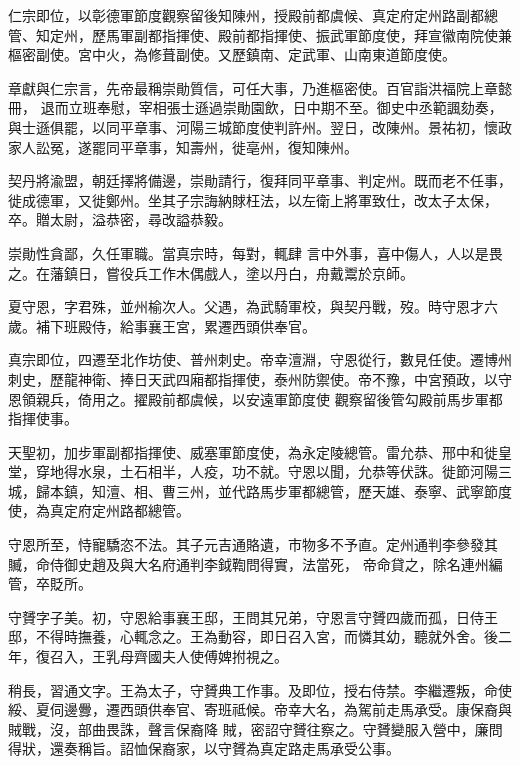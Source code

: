 \begin{pinyinscope}
 仁宗即位，以彰德軍節度觀察留後知陳州，授殿前都虞候、真定府定州路副都總管、知定州，歷馬軍副都指揮使、殿前都指揮使、振武軍節度使，拜宣徽南院使兼樞密副使。宮中火，為修葺副使。又歷鎮南、定武軍、山南東道節度使。



 章獻與仁宗言，先帝最稱崇勛質信，可任大事，乃進樞密使。百官詣洪福院上章懿冊，
 退而立班奉慰，宰相張士遜過崇勛園飲，日中期不至。御史中丞範諷劾奏，與士遜俱罷，以同平章事、河陽三城節度使判許州。翌日，改陳州。景祐初，懷政家人訟冤，遂罷同平章事，知壽州，徙亳州，復知陳州。



 契丹將渝盟，朝廷擇將備邊，崇勛請行，復拜同平章事、判定州。既而老不任事，徙成德軍，又徙鄭州。坐其子宗誨納賕枉法，以左衛上將軍致仕，改太子太保，卒。贈太尉，溢恭密，尋改謚恭毅。



 崇勛性貪鄙，久任軍職。當真宗時，每對，輒肆
 言中外事，喜中傷人，人以是畏之。在藩鎮日，嘗役兵工作木偶戲人，塗以丹白，舟戴鬻於京師。



 夏守恩，字君殊，並州榆次人。父遇，為武騎軍校，與契丹戰，歿。時守恩才六歲。補下班殿侍，給事襄王宮，累遷西頭供奉官。



 真宗即位，四遷至北作坊使、普州刺史。帝幸澶淵，守恩從行，數見任使。遷博州刺史，歷龍神衛、捧日天武四廂都指揮使，泰州防禦使。帝不豫，中宮預政，以守恩領親兵，倚用之。擢殿前都虞候，以安遠軍節度使
 觀察留後管勾殿前馬步軍都指揮使事。



 天聖初，加步軍副都指揮使、威塞軍節度使，為永定陵總管。雷允恭、邢中和徙皇堂，穿地得水泉，土石相半，人疫，功不就。守恩以聞，允恭等伏誅。徙節河陽三城，歸本鎮，知澶、相、曹三州，並代路馬步軍都總管，歷天雄、泰寧、武寧節度使，為真定府定州路都總管。



 守恩所至，恃寵驕恣不法。其子元吉通賂遺，市物多不予直。定州通判李參發其贓，命侍御史趙及與大名府通判李鉞鞫問得實，法當死，
 帝命貸之，除名連州編管，卒貶所。



 守贇字子美。初，守恩給事襄王邸，王問其兄弟，守恩言守贇四歲而孤，日侍王邸，不得時撫養，心輒念之。王為動容，即日召入宮，而憐其幼，聽就外舍。後二年，復召入，王乳母齊國夫人使傅婢拊視之。



 稍長，習通文字。王為太子，守贇典工作事。及即位，授右侍禁。李繼遷叛，命使綏、夏伺邊釁，遷西頭供奉官、寄班祗候。帝幸大名，為駕前走馬承受。康保裔與賊戰，沒，部曲畏誅，聲言保裔降
 賊，密詔守贇往察之。守贇變服入營中，廉問得狀，還奏稱旨。詔恤保裔家，以守贇為真定路走馬承受公事。




\end{pinyinscope}
